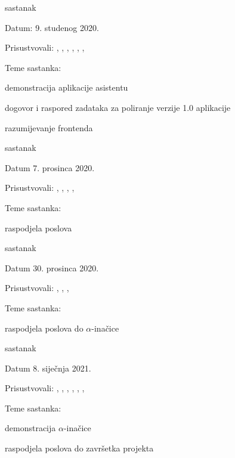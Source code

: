 \begin{packed_enum}
			\item  sastanak
			\item[] \begin{packed_item}
				\item Datum: 9. studenog 2020.
				\item Prisustvovali: \djo, \fuc, \hab, \hre, \juk, \luk, \pav
				\item Teme sastanka:
				\begin{packed_item}
					\item  demonstracija aplikacije asistentu
					\item  dogovor i raspored zadataka za poliranje verzije 1.0 aplikacije
					\item  razumijevanje frontenda
				\end{packed_item}
			\end{packed_item}
		
			\item sastanak
			\item[] \begin{packed_item}
				\item Datum 7. prosinca 2020.
				\item Prisustvovali: \djo, \fuc, \hre, \juk, \pav
				\item Teme sastanka:
				\begin{packed_item}
					\item  raspodjela poslova
				\end{packed_item} 
			\end{packed_item}
		
			\item sastanak
			\item[] \begin{packed_item}
				\item Datum 30. prosinca 2020.
				\item Prisustvovali: \djo, \hab, \hre, \juk
				\item Teme sastanka:
				\begin{packed_item}
					\item  raspodjela poslova do $\alpha$-inačice
				\end{packed_item} 
			\end{packed_item}
		
			\item sastanak
			\item[] \begin{packed_item}
				\item Datum 8. siječnja 2021.
				\item Prisustvovali: \djo, \fuc, \hab, \hre, \juk, \luk, \pav
				\item Teme sastanka:
				\begin{packed_item}
					\item  demonstracija $\alpha$-inačice
					\item  raspodjela poslova do završetka projekta
				\end{packed_item} 
			\end{packed_item}
			
		\end{packed_enum}
		
